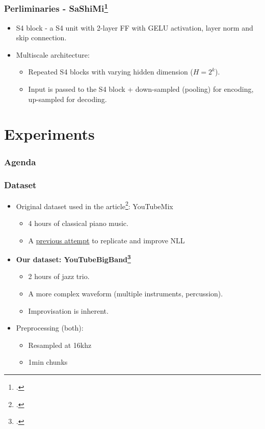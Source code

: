 \documentclass{beamer}
\begin{document}
\begin{frame}
    \frametitle{Perliminaries - SaShiMi\footcite{goel2022itsrawaudiogeneration}}
    \begin{itemize}
        \item S4 block - a S4 unit with 2-layer FF with GELU activation, layer norm and skip connection.
        \item Multiscale architecture: 
        \begin{itemize}
            \item Repeated S4 blocks with varying hidden dimension ($H = 2^k$).
            \item Input is passed to the S4 block + down-sampled (pooling) for encoding,  up-sampled for decoding. 
        \end{itemize}
    \end{itemize}
\end{frame}

\section{Experiments}
\begin{frame}
    \frametitle{Agenda}
    \tableofcontents[currentsection]
\end{frame}

\begin{frame}
    \frametitle{Dataset}
    \begin{itemize}
        \item Original dataset used in the article\footcite{deepsound}: YouTubeMix
        \begin{itemize} 
            \item 4 hours of classical piano music.
            \item A \href{https://necrashter.github.io/sashimi-796}{previous attempt} to replicate and improve NLL
        \end{itemize}
        \item \textbf{Our dataset: YouTubeBigBand\footcite{bigband}}
            \begin{itemize}
                \item 2 hours of jazz trio.
                \item A more complex waveform (multiple instruments, percussion).
                \item Improvisation is inherent.
        \end{itemize}
        \item Preprocessing (both):
        \begin{itemize}
            \item Resampled at 16khz
            \item 1min chunks
        \end{itemize}
    \end{itemize}
\end{frame}
\end{document}

